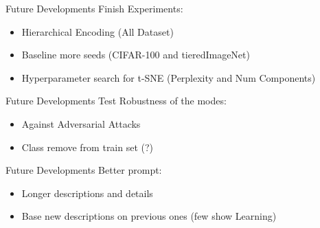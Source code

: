 \begin{frame}{Future Developments}
  Finish Experiments:
  \begin{itemize}
    \item Hierarchical Encoding (All Dataset)
    \item Baseline more seeds (CIFAR-100 and tieredImageNet)
    \item Hyperparameter search for t-SNE (Perplexity and Num Components)
  \end{itemize}
\end{frame}

\begin{frame}{Future Developments}
  Test Robustness of the modes:
  \begin{itemize}
    \item Against Adversarial Attacks
    \item Class remove from train set (?)
  \end{itemize}
\end{frame}

\begin{frame}{Future Developments}
  Better prompt:
  \begin{itemize}
    \item Longer descriptions and details
    \item Base new descriptions on previous ones (few show Learning)
  \end{itemize}
\end{frame}
